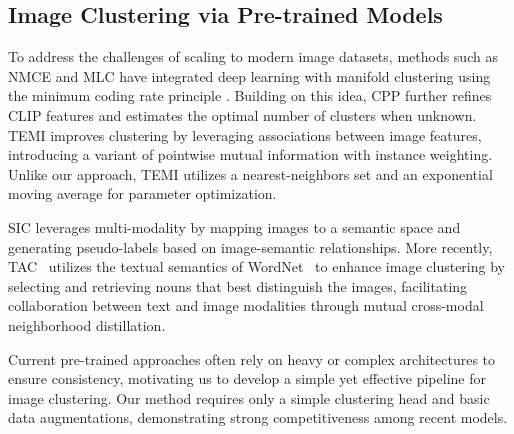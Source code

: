 \subsection{Image Clustering via Pre-trained Models}
To address the challenges of scaling to modern image datasets, methods such as NMCE \cite{li2022neural} and MLC \cite{deng2023acp} have integrated deep learning with manifold clustering using the minimum coding rate principle \cite{Arthur_Vassilvitskii_2007}. Building on this idea, CPP \cite{chu2024image} further refines CLIP features and estimates the optimal number of clusters when unknown. TEMI \cite{adaloglou2023exploring} improves clustering by leveraging associations between image features, introducing a variant of pointwise mutual information with instance weighting. Unlike our approach, TEMI utilizes a nearest-neighbors set and an exponential moving average for parameter optimization.

SIC \cite{cai2023semantic} leverages multi-modality by mapping images to a semantic space and generating pseudo-labels based on image-semantic relationships. More recently, TAC~\cite{li2023image} utilizes the textual semantics of WordNet~\cite{miller1995wordnet} to enhance image clustering by selecting and retrieving nouns that best distinguish the images, facilitating collaboration between text and image modalities through mutual cross-modal neighborhood distillation.

Current pre-trained approaches often rely on heavy or complex architectures to ensure consistency, motivating us to develop a simple yet effective pipeline for image clustering. Our method requires only a simple clustering head and basic data augmentations, demonstrating strong competitiveness among recent models.







